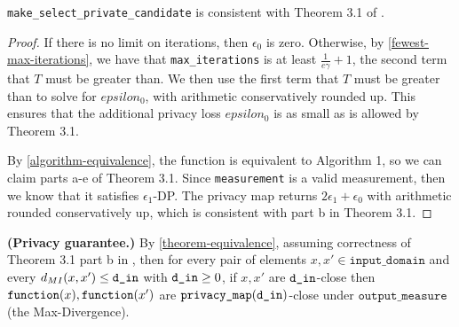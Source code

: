 \documentclass{article}
\begin{document}
\begin{theorem}
    \label{theorem-equivalence}
    \texttt{make\_select\_private\_candidate} is consistent with Theorem 3.1 of \cite{liu2018privateselectionprivatecandidates}.
\end{theorem}

\begin{proof}
    If there is no limit on iterations, then $\epsilon_0$ is zero.
    Otherwise, by \ref{fewest-max-iterations}, we have that \texttt{max\_iterations} is at least $\frac{1}{e \gamma} + 1$, 
    the second term that $T$ must be greater than.
    We then use the first term that $T$ must be greater than to solve for $epsilon_0$, 
    with arithmetic conservatively rounded up.
    This ensures that the additional privacy loss $epsilon_0$ is as small as is allowed by Theorem 3.1.

    By \ref{algorithm-equivalence}, the function is equivalent to Algorithm 1, so we can claim parts a-e of Theorem 3.1.
    Since \texttt{measurement} is a valid measurement, then we know that it satisfies $\epsilon_1$-DP.
    The privacy map returns $2\epsilon_1 + \epsilon_0$ with arithmetic rounded conservatively up,
    which is consistent with part b in Theorem 3.1.
\end{proof}

\textbf{(Privacy guarantee.)} 
By \ref{theorem-equivalence}, assuming correctness of Theorem 3.1 part b in \cite{liu2018privateselectionprivatecandidates},
then for every pair of elements $x, x' \in \texttt{input\_domain}$ and every $d_{MI}(x, x') \le \texttt{d\_in}$ with $\texttt{d\_in} \ge 0$, 
if $x, x'$ are $\texttt{d\_in}$-close then $\texttt{function}(x), \texttt{function}(x')$ are $\texttt{privacy\_map}(\texttt{d\_in})$-close under $\texttt{output\_measure}$ (the Max-Divergence).



\end{document}
